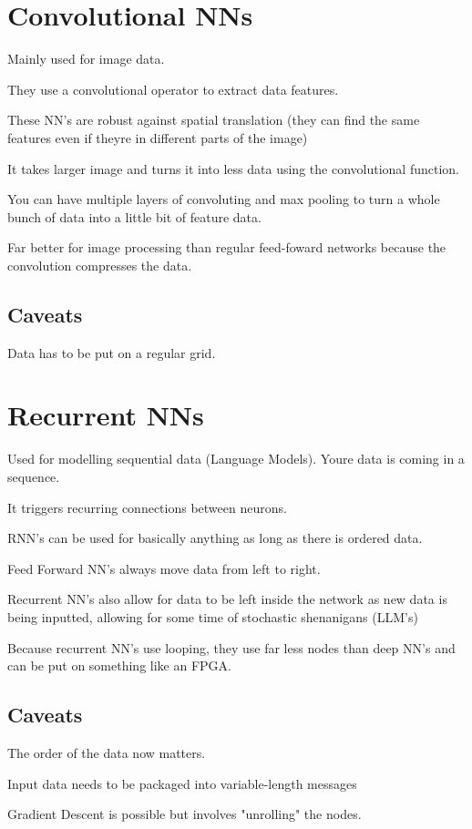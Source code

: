 \documentclass[fleqn]{report}
\begin{document}
\section{Convolutional NNs}
Mainly used for image data. 

They use a convolutional operator to extract data features. 

These NN's are robust against spatial translation (they 
can find the same features even if theyre in different parts of the image)

It takes larger image and turns it into less data using the convolutional 
function. 

You can have multiple layers of convoluting and max pooling to turn a 
whole bunch of data into a little bit of feature data. 

Far better for image processing than regular feed-foward networks because 
the convolution compresses the data. 

\subsection{Caveats}
Data has to be put on a regular grid. 

\section{Recurrent NNs}
Used for modelling sequential data (Language Models). Youre data is 
coming in a sequence.

It triggers recurring connections between neurons. 

RNN's can be used for basically anything as long as there is ordered data. 

Feed Forward NN's always move data from left to right. 

Recurrent NN's also allow for data to be left inside the network as new data 
is being inputted, allowing for some time of stochastic shenanigans (LLM's)

Because recurrent NN's use looping, they use far less nodes than deep NN's 
and can be put on something like an FPGA.

\subsection{Caveats}
The order of the data now matters. 

Input data needs to be packaged into variable-length messages 

Gradient Descent is possible but involves "unrolling" the nodes. 
\end{document}
